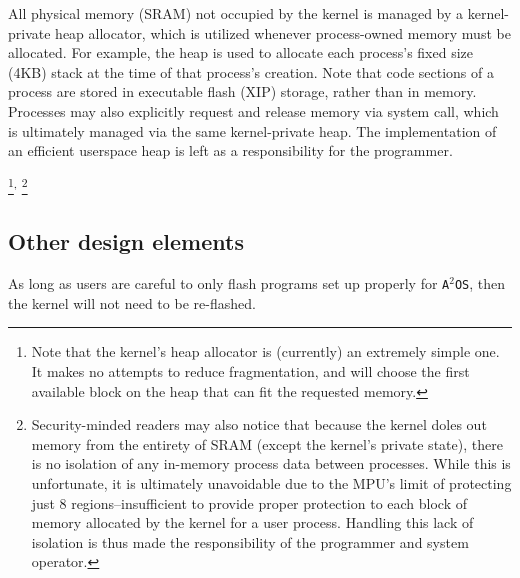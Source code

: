 \documentclass[12pt]{article}
\newcommand\fnsep{\textsuperscript{,}}
\newcommand{\osns}{\texttt{A$^2$OS}}
\begin{document}
All physical memory (SRAM) not occupied by the kernel is managed by a
kernel-private heap allocator, which is utilized whenever process-owned memory
must be allocated. For example, the heap is used to allocate each process's
fixed size (4KB) stack at the time of that process's creation. Note that code
sections of a process are stored in executable flash (XIP) storage, rather than
in memory. Processes may also explicitly request and release memory via system
call, which is ultimately managed via the same kernel-private heap. The
implementation of an efficient userspace heap is left as a responsibility for
the programmer.

\footnote{Note
that the kernel's heap allocator is (currently) an extremely simple one. It
makes no attempts to reduce fragmentation, and will choose the first available
block on the heap that can fit the requested memory.}\fnsep
\footnote{Security-minded readers may also notice that because the kernel doles
out memory from the entirety of SRAM (except the kernel's private state), there
is no isolation of any in-memory process data between processes. While this is
unfortunate, it is ultimately unavoidable due to the MPU's limit of protecting
just 8 regions--insufficient to provide proper protection to each block of
memory allocated by the kernel for a user process. Handling this lack of
isolation is thus made the responsibility of the programmer and system
operator.}

\subsection{Other design elements}
As long as users are careful to only flash programs set up properly for \osns,
then the kernel will not need to be re-flashed.
\end{document}
